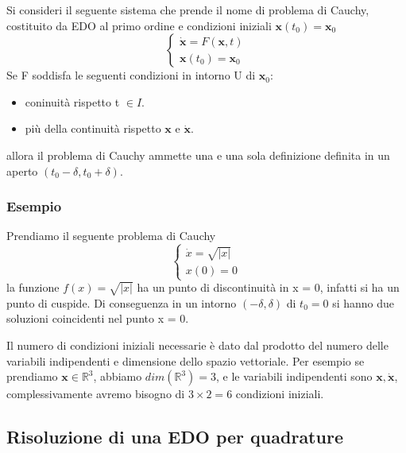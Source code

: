 \begin{theorem}
Si consideri il seguente sistema che prende il nome di problema di Cauchy, costituito da EDO al primo ordine e condizioni iniziali $\bm{x}(t_0) = \bm{x}_0$
\begin{equation*}
	\left \{ \begin{array}{l}
		\dot{\bm{x}} = F (\bm{x},t) \\
		\bm{x}(t_0) = \bm{x}_0
	\end{array}\right.
\end{equation*}	
Se F soddisfa le seguenti condizioni in intorno U di $\bm{x}_0$:
\begin{itemize}
	\item coninuit\`{a} rispetto t $\in I$.
	\item pi\`{u} della continuit\`{a} rispetto $\bm{x}$ e $\bm{\dot{x}}$.
\end{itemize}
allora il problema di Cauchy ammette una e una sola definizione definita in un aperto $(t_0 - \delta,t_0 + \delta)$.
\end{theorem}

\subsubsection{Esempio}

Prendiamo il seguente problema di Cauchy 
\begin{equation*}
	\left \{ \begin{array}{l}
		\dot{x} = \sqrt{|x|}\\
		x(0) = 0
	\end{array} \right.
\end{equation*}
la funzione $f(x) = \sqrt{|x|}$ ha un punto di discontinuit\`{a} in x = 0, infatti si ha un punto di cuspide. Di conseguenza in un intorno $(-\delta,\delta)$ di $t_0 = 0$ si hanno due soluzioni coincidenti nel punto x = 0.

\begin{remark}
Il numero di condizioni iniziali necessarie \`{e} dato dal prodotto del numero delle variabili indipendenti e dimensione dello spazio vettoriale.
Per esempio se prendiamo $\bm{x} \in \mathbb{R}^{3}$, abbiamo $dim(\mathbb{R}^{3}) = 3$, e le variabili indipendenti sono $\bm{x},\bm{\dot{x}}$, complessivamente avremo bisogno di $3 \times 2 = 6$ condizioni iniziali.	
\end{remark}

\subsection{Risoluzione di una EDO per quadrature}

